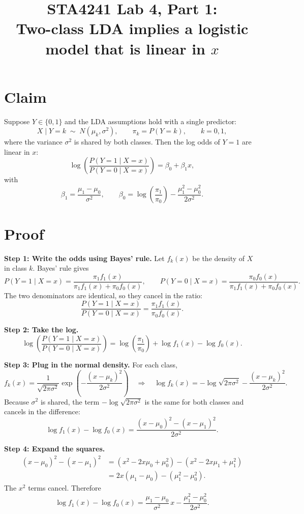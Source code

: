 \documentclass[11pt]{article}
\title{STA4241 Lab 4, Part 1:\\ Two-class LDA implies a logistic model that is linear in $x$}
\author{}
\date{}
\begin{document}
\maketitle

\section*{Claim}

Suppose $Y \in \{0, 1\}$ and the LDA assumptions hold with a single predictor:
\[
X \mid Y = k \;\sim\; N(\mu_k, \sigma^2), \qquad \pi_k = P(Y = k), \qquad k = 0, 1,
\]
where the variance $\sigma^2$ is shared by both classes. Then the log odds of $Y = 1$ are linear in $x$:
\[
\log\!\left( \frac{P(Y = 1 \mid X = x)}{P(Y = 0 \mid X = x)} \right) = \beta_0 + \beta_1 x,
\]
with
\[
\beta_1 = \frac{\mu_1 - \mu_0}{\sigma^2},
\qquad
\beta_0 = \log\!\left(\frac{\pi_1}{\pi_0}\right) - \frac{\mu_1^2 - \mu_0^2}{2\sigma^2}.
\]

\section*{Proof}

\textbf{Step 1: Write the odds using Bayes' rule.}
Let $f_k(x)$ be the density of $X$ in class $k$. Bayes' rule gives
\[
P(Y = 1 \mid X = x) = \frac{\pi_1 f_1(x)}{\pi_1 f_1(x) + \pi_0 f_0(x)},
\qquad
P(Y = 0 \mid X = x) = \frac{\pi_0 f_0(x)}{\pi_1 f_1(x) + \pi_0 f_0(x)}.
\]
The two denominators are identical, so they cancel in the ratio:
\[
\frac{P(Y = 1 \mid X = x)}{P(Y = 0 \mid X = x)} = \frac{\pi_1 f_1(x)}{\pi_0 f_0(x)}.
\]

\textbf{Step 2: Take the log.}
\[
\log\!\left( \frac{P(Y = 1 \mid X = x)}{P(Y = 0 \mid X = x)} \right)
= \log\!\left(\frac{\pi_1}{\pi_0}\right) + \log f_1(x) - \log f_0(x).
\]

\textbf{Step 3: Plug in the normal density.}
For each class,
\[
f_k(x) = \frac{1}{\sqrt{2\pi\sigma^2}} \exp\!\left( -\frac{(x - \mu_k)^2}{2\sigma^2} \right)
\quad\Longrightarrow\quad
\log f_k(x) = -\log\sqrt{2\pi\sigma^2} - \frac{(x - \mu_k)^2}{2\sigma^2}.
\]
Because $\sigma^2$ is shared, the term $-\log\sqrt{2\pi\sigma^2}$ is the same for both classes and cancels in the difference:
\[
\log f_1(x) - \log f_0(x) = \frac{(x - \mu_0)^2 - (x - \mu_1)^2}{2\sigma^2}.
\]

\textbf{Step 4: Expand the squares.}
\begin{align*}
(x - \mu_0)^2 - (x - \mu_1)^2
&= \left( x^2 - 2x\mu_0 + \mu_0^2 \right) - \left( x^2 - 2x\mu_1 + \mu_1^2 \right) \\
&= 2x(\mu_1 - \mu_0) - \left( \mu_1^2 - \mu_0^2 \right).
\end{align*}
The $x^2$ terms cancel. Therefore
\[
\log f_1(x) - \log f_0(x) = \frac{\mu_1 - \mu_0}{\sigma^2}\, x - \frac{\mu_1^2 - \mu_0^2}{2\sigma^2}.
\]
\end{document}
